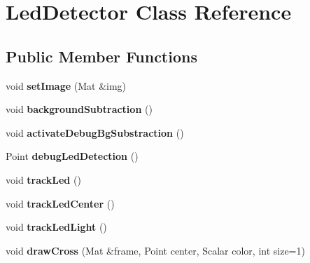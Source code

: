 \hypertarget{classLedDetector}{}\section{Led\+Detector Class Reference}
\label{classLedDetector}
\subsection*{Public Member Functions}
\begin{DoxyCompactItemize}
\item 
\hypertarget{classLedDetector_a0f280ba70ebf743afc71b9a63411d720}{}void {\bfseries set\+Image} (Mat \&img)\label{classLedDetector_a0f280ba70ebf743afc71b9a63411d720}

\item 
\hypertarget{classLedDetector_ac9ce809e89dff011f1cdcae4337364a3}{}void {\bfseries background\+Subtraction} ()\label{classLedDetector_ac9ce809e89dff011f1cdcae4337364a3}

\item 
\hypertarget{classLedDetector_ae026c4dfa42a32f1a870774ebe775e98}{}void {\bfseries activate\+Debug\+Bg\+Substraction} ()\label{classLedDetector_ae026c4dfa42a32f1a870774ebe775e98}

\item 
\hypertarget{classLedDetector_a629b7ec493e513d956c3ca9622f3b405}{}Point {\bfseries debug\+Led\+Detection} ()\label{classLedDetector_a629b7ec493e513d956c3ca9622f3b405}

\item 
\hypertarget{classLedDetector_a4ce1110914331c419ed7e4c14d343ab1}{}void {\bfseries track\+Led} ()\label{classLedDetector_a4ce1110914331c419ed7e4c14d343ab1}

\item 
\hypertarget{classLedDetector_af2fdcf7e4b5047c6c4c48f14c44b4b9b}{}void {\bfseries track\+Led\+Center} ()\label{classLedDetector_af2fdcf7e4b5047c6c4c48f14c44b4b9b}

\item 
\hypertarget{classLedDetector_a289688384f3c571612f751d99c97edfb}{}void {\bfseries track\+Led\+Light} ()\label{classLedDetector_a289688384f3c571612f751d99c97edfb}

\item 
\hypertarget{classLedDetector_a3ac0d3385963a14e6947340edf3bb5ee}{}void {\bfseries draw\+Cross} (Mat \&frame, Point center, Scalar color, int size=1)\label{classLedDetector_a3ac0d3385963a14e6947340edf3bb5ee}


\end{DoxyCompactItemize}
